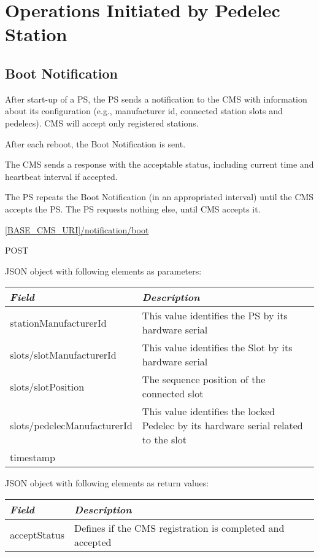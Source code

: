 \section{Operations Initiated by Pedelec Station}

\subsection{Boot Notification}

After start-up of a \acs{PS}, the \acs{PS} sends a notification to the \acs{CMS} with information about its configuration (e.g., manufacturer id, connected station slots and pedelecs). \acs{CMS} will accept only registered stations. 

After each reboot, the Boot Notification is sent.

The \acs{CMS} sends a response with the acceptable status, including current time and heartbeat interval if accepted.

The \acs{PS} repeats the Boot Notification (in an appropriated interval) until the \acs{CMS} accepts the \acs{PS}. The \acs{PS} requests nothing else, until \acs{CMS} accepts it.


 \url{[BASE_CMS_URI]/notification/boot}

 POST

JSON object with following elements as parameters:\\
\begin{tabularx}{\linewidth}{ | l | X | }
  \hline
  \textit{Field} & \textit{Description} \\
  \hline \hline
  stationManufacturerId 		& This value identifies the PS by its hardware serial\\
  slots/slotManufacturerId 	& This value identifies the Slot by its hardware serial \\
  slots/slotPosition			& The sequence position of the connected slot \\
  slots/pedelecManufacturerId & This value identifies the locked Pedelec by its hardware serial related to the slot \\
  timestamp & \\
    \hline
\end{tabularx}

JSON object with following elements as return values:\\
\begin{tabularx}{\linewidth}{ | l | X | }
  \hline
  \textit{Field} & \textit{Description} \\
  \hline \hline
  acceptStatus 		& Defines if the CMS registration is completed and accepted \\
    \hline
\end{tabularx}

